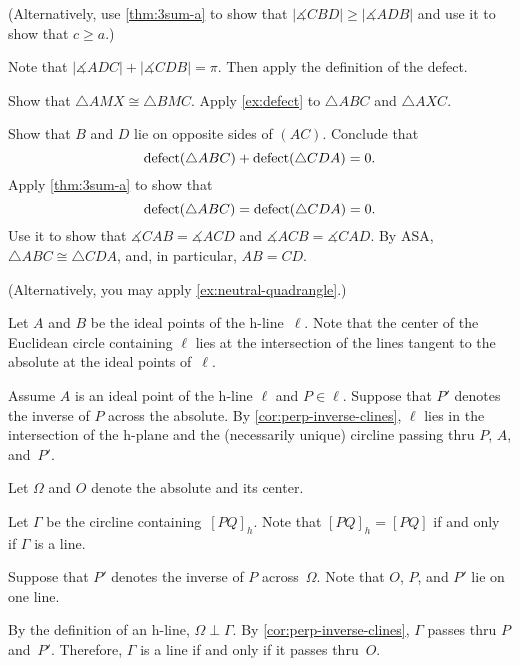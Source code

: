 \begin{multicols}{2}
(Alternatively, use \ref{thm:3sum-a} to show that $|\measuredangle CBD|\ge|\measuredangle ADB|$ and use it to show that $c\ge a$.)

Note that 
$|\measuredangle ADC|+|\measuredangle CDB|=\pi$.
Then apply the definition of the defect.

Show that $\triangle AMX\cong \triangle BMC$. 
Apply \ref{ex:defect} to $\triangle ABC$ and $\triangle AXC$.


Show that $B$ and $D$ lie on opposite sides of $(AC)$.
Conclude that 
\[\mathop{\rm defect}\nolimits(\triangle ABC)+\mathop{\rm defect}\nolimits(\triangle CDA)=0.\]
Apply \ref{thm:3sum-a} to show that 
\[\mathop{\rm defect}\nolimits(\triangle ABC)=\mathop{\rm defect}\nolimits(\triangle CDA)=0.\]
Use it to show that $\measuredangle CAB=\measuredangle ACD$ and $\measuredangle ACB=\measuredangle CAD$.
By ASA, $\triangle ABC\cong\triangle CDA$, and, in particular, $AB=CD$.

(Alternatively, you may apply \ref{ex:neutral-quadrangle}.)

\setcounter{eqtn}{0}

Let $A$ and $B$ be the ideal points of the h-line~$\ell$. 
Note that the center of the Euclidean circle containing $\ell$ lies 
at the intersection of the lines tangent to the absolute at the ideal points of~$\ell$.

Assume $A$ is an ideal point of the h-line $\ell$
and $P\in \ell$.
Suppose that $P'$ denotes the inverse of $P$ across the absolute.
By \ref{cor:perp-inverse-clines},
$\ell$ lies in the intersection of the h-plane and the (necessarily unique) circline 
passing thru $P$, $A$, and~$P'$.

Let $\Omega$ and $O$ denote the absolute and its center. 

Let $\Gamma$ be the circline containing~$[PQ]_h$.
Note that $[PQ]_h=[PQ]$ if and only if $\Gamma$ is a line.

Suppose that $P'$ denotes the inverse of $P$ across~$\Omega$.
Note that $O$, $P$, and $P'$ lie on one line.

By the definition of an h-line, $\Omega\perp \Gamma$.
By \ref{cor:perp-inverse-clines}, $\Gamma$ passes thru $P$ and~$P'$. 
Therefore, $\Gamma$
is a line if and only if it passes thru~$O$.


\end{multicols}
